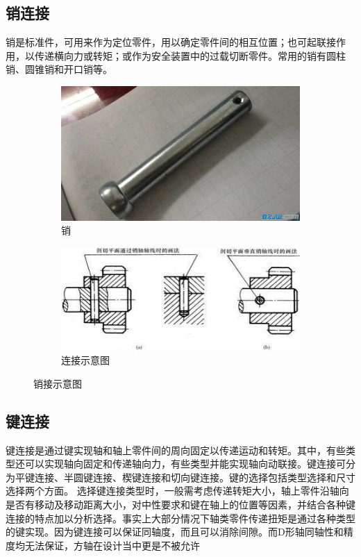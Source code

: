 \documentclass[UTF8]{article} %
\begin{document}
\subsection{销连接}
销是标准件，可用来作为定位零件，用以确定零件间的相互位置；也可起联接作用，以传递横向力或转矩；或作为安全装置中的过载切断零件。常用的销有圆柱销、圆锥销和开口销等。

\begin{figure}[H]
  \centering
  \begin{subfigure}[b]{0.35\textwidth}
         \centering
         \includegraphics[width=\textwidth]{xiao1.png}
          \caption{销}
  \end{subfigure}
  \quad
  \begin{subfigure}[b]{0.4\textwidth}
          \centering
          \includegraphics[width=\textwidth]{xiao2.png}
          \caption{连接示意图}
  \end{subfigure}
  \caption{销接示意图}
\end{figure}

\subsection{键连接}
键连接是通过键实现轴和轴上零件间的周向固定以传递运动和转矩。其中，有些类型还可以实现轴向固定和传递轴向力，有些类型并能实现轴向动联接。键连接可分为平键连接、半圆键连接、楔键连接和切向键连接。键的选择包括类型选择和尺寸选择两个方面。
选择键连接类型时，一般需考虑传递转矩大小，轴上零件沿轴向是否有移动及移动距离大小，对中性要求和键在轴上的位置等因素，并结合各种键连接的特点加以分析选择。事实上大部分情况下轴类零件传递扭矩是通过各种类型的键实现。因为键连接可以保证同轴度，而且可以消除间隙。而D形轴同轴性和精度均无法保证，方轴在设计当中更是不被允许
\end{document}
